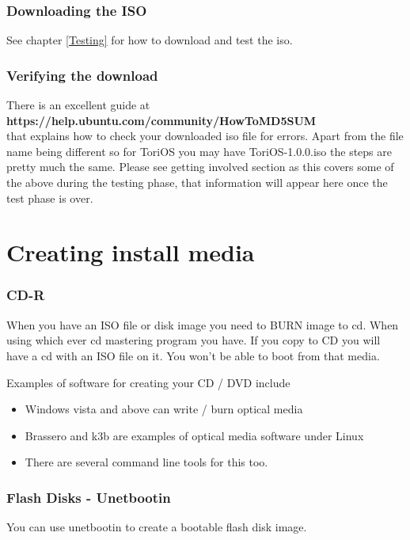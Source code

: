 \documentclass[12pt,a4paper]{book}
\begin{document}
\subsection{Downloading the ISO}

See chapter \ref{Testing} for how to download and test the iso. 



\subsection{Verifying the download}
There is an excellent guide at\\ \textbf{https://help.ubuntu.com/community/HowToMD5SUM} \\
that explains how to check your downloaded iso file for errors.  Apart from the file name being different so for ToriOS you may have ToriOS-1.0.0.iso the steps are pretty much the same.  
Please see getting involved section as this covers some of the above during the testing phase,  that information will appear here once the test phase is over. 
\chapter{Creating install media}

\subsection{CD-R}

When you have an ISO file or disk image you need to BURN image to cd.  When using which ever cd mastering program you have.  If you copy to CD you will have a cd with an ISO file on it.  You won't be able to boot from that media.

Examples of software for creating your CD / DVD include

\begin{itemize}
\item Windows vista and above can write / burn optical media
\item Brassero and k3b are examples of optical media software under Linux
\item There are several command line tools for this too.
\end{itemize}

\subsection{Flash Disks - Unetbootin}
You can use unetbootin to create a bootable flash disk image.   
\end{document}
